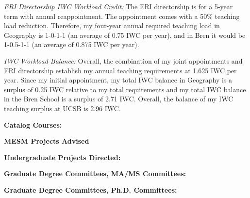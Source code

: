 \documentclass[10pt]{article}
\begin{document}
\begin{enumerate}
{\item {\em ERI Directorship IWC Workload Credit:} The ERI directorship is for a 5-year term with annual reappointment.  The appointment comes with a 50\% teaching load reduction. Therefore, my four-year annual required teaching load in Geography is 1-0-1-1 (an average of 0.75 IWC per year), and in Bren it would be 1-0.5-1-1 (an average of 0.875 IWC per year). 

\item {\em IWC Workload Balance:} Overall, the combination of my joint appointments and ERI directorship establish my annual teaching requirements at 1.625 IWC per year. Since my initial appointment, my total IWC balance in Geography is a surplus of 0.25 IWC relative to my total requirements and my total IWC balance in the Bren School is a surplus of 2.71 IWC.  Overall, the balance of my IWC teaching surplus at UCSB is 2.96 IWC.
}
\end{enumerate}

\vspace{1.5cm}
{\bf Catalog Courses:}


\vspace{1.5cm}
{\bf MESM Projects Advised}


\vspace{1cm}
{\bf Undergraduate Projects Directed:}


\vspace{1cm}
{\bf Graduate Degree Committees, MA/MS Committees:}
\vspace{0.25cm}



\vspace{0.5cm}
{\bf Graduate Degree Committees, Ph.D. Committees:}
\vspace{0.25cm}

\end{document}

